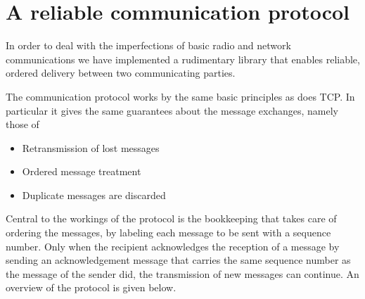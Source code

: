 
\section{A reliable communication protocol}

In order to deal with the imperfections of basic radio and network
communications we have implemented a rudimentary library that enables reliable,
ordered delivery between two communicating parties.

The communication protocol works by the same basic principles as does TCP. In
particular it gives the same guarantees about the message exchanges, namely
those of

\begin{itemize}

\item Retransmission of lost messages

\item Ordered message treatment %

\item Duplicate messages are discarded

\end{itemize}

Central to the workings of the protocol is the bookkeeping that takes care of
ordering the messages, by labeling each message to be sent with a sequence
number. Only when the recipient acknowledges the reception of a message by
sending an acknowledgement message that carries the same sequence number as the
message of the sender did, the transmission of new messages can continue.  An
overview of the protocol is given below.

